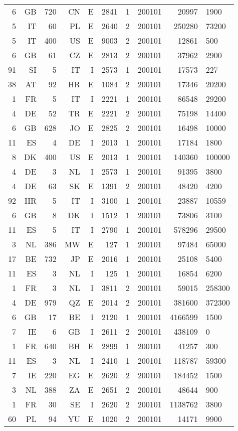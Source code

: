 {\begin{tabular}{rrrrrrrrr}
  6 & GB & 720 & CN & E & 2841 & 1 & 200101 & 20997 & 1900 \\
  5 & IT & 60 & PL & E & 2640 & 2 & 200101 & 250280 & 73200 \\
  5 & IT & 400 & US & E & 9003 & 2 & 200101 & 12861 & 500 \\
  6 & GB & 61 & CZ & E & 2813 & 2 & 200101 & 37962 & 2900 \\
  91 & SI & 5 & IT & I & 2573 & 1 & 200101 & 17573 & 227 \\
  38 & AT & 92 & HR & E & 1084 & 2 & 200101 & 17346 & 20200 \\
  1 & FR & 5 & IT & I & 2221 & 1 & 200101 & 86548 & 29200 \\
  4 & DE & 52 & TR & E & 2221 & 2 & 200101 & 75198 & 14400 \\
  6 & GB & 628 & JO & E & 2825 & 2 & 200101 & 16498 & 10000 \\
  11 & ES & 4 & DE & I & 2013 & 1 & 200101 & 17184 & 1800 \\
  8 & DK & 400 & US & E & 2013 & 1 & 200101 & 140360 & 100000 \\
  4 & DE & 3 & NL & I & 2573 & 1 & 200101 & 91395 & 3800 \\
  4 & DE & 63 & SK & E & 1391 & 2 & 200101 & 48420 & 4200 \\
  92 & HR & 5 & IT & I & 3100 & 1 & 200101 & 23887 & 10559 \\
  6 & GB & 8 & DK & I & 1512 & 1 & 200101 & 73806 & 3100 \\
  11 & ES & 5 & IT & I & 2790 & 1 & 200101 & 578296 & 29500 \\
  3 & NL & 386 & MW & E & 127 & 1 & 200101 & 97484 & 65000 \\
  17 & BE & 732 & JP & E & 2016 & 1 & 200101 & 25108 & 5400 \\
  11 & ES & 3 & NL & I & 125 & 1 & 200101 & 16854 & 6200 \\
  1 & FR & 3 & NL & I & 3811 & 2 & 200101 & 59015 & 258300 \\
  4 & DE & 979 & QZ & E & 2014 & 2 & 200101 & 381600 & 372300 \\
  6 & GB & 17 & BE & I & 2120 & 1 & 200101 & 4166599 & 1500 \\
  7 & IE & 6 & GB & I & 2611 & 2 & 200101 & 438109 & 0 \\
  1 & FR & 640 & BH & E & 2899 & 1 & 200101 & 41257 & 300 \\
  11 & ES & 3 & NL & I & 2410 & 1 & 200101 & 118787 & 59300 \\
  7 & IE & 220 & EG & E & 2620 & 2 & 200101 & 184452 & 1500 \\
  3 & NL & 388 & ZA & E & 2651 & 2 & 200101 & 48644 & 900 \\
  1 & FR & 30 & SE & I & 2620 & 2 & 200101 & 1138762 & 3800 \\
  60 & PL & 94 & YU & E & 1020 & 2 & 200101 & 14171 & 9900 \\
 \bottomrule
\end{tabular}
}

